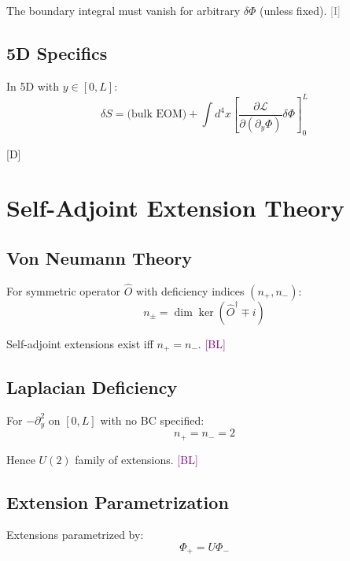 \documentclass[11pt,a4paper]{article}
\newcommand{\tagD}{\textcolor{blue!70!black}{[D]}}
\newcommand{\tagI}{\textcolor{gray}{[I]}}
\newcommand{\tagBL}{\textcolor{purple}{[BL]}}
\begin{document}
The boundary integral must vanish for arbitrary $\delta\Phi$ (unless fixed). \tagI

\subsection{5D Specifics}

In 5D with $y \in [0, L]$:
\begin{equation}
\label{eq:app-5d-var}
\delta S = \text{(bulk EOM)} + \int d^4x \left[ \frac{\partial \mathcal{L}}{\partial(\partial_y \Phi)} \delta\Phi \right]_0^L
\end{equation}

\tagD

\section{Self-Adjoint Extension Theory}
\label{app:sa}

\subsection{Von Neumann Theory}

For symmetric operator $\hat{O}$ with deficiency indices $(n_+, n_-)$:
\begin{equation}
\label{eq:app-deficiency}
n_\pm = \dim \ker(\hat{O}^\dagger \mp i)
\end{equation}

Self-adjoint extensions exist iff $n_+ = n_-$. \tagBL

\subsection{Laplacian Deficiency}

For $-\partial_y^2$ on $[0, L]$ with no BC specified:
\begin{equation}
\label{eq:app-lap-def}
n_+ = n_- = 2
\end{equation}

Hence $U(2)$ family of extensions. \tagBL

\subsection{Extension Parametrization}

Extensions parametrized by:
\begin{equation}
\label{eq:app-ext-param}
\Phi_+ = U \Phi_-
\end{equation}
\end{document}
